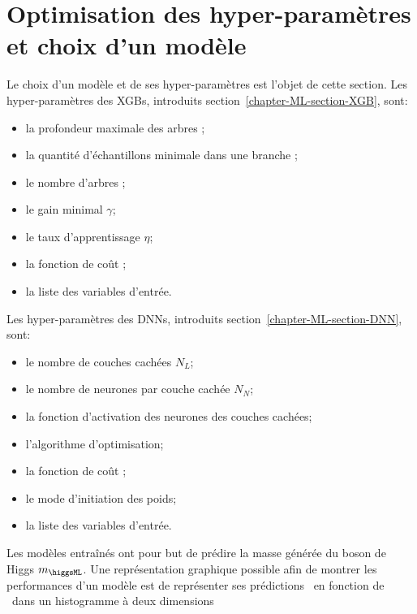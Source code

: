 \section{Optimisation des hyper-paramètres et choix d'un modèle}\label{chapter-ML-section-hyperparameters}
Le choix d'un modèle et de ses hyper-paramètres est l'objet de cette section.
Les hyper-paramètres des XGBs, introduits section~\ref{chapter-ML-section-XGB}, sont:
\begin{itemize}
\item la profondeur maximale des arbres \MaxDepth;
\item la quantité d'échantillons minimale dans une branche \MinChildWeight;
\item le nombre d'arbres \Nestimators;
\item le gain minimal $\gamma$;
\item le taux d'apprentissage $\eta$;
\item la fonction de coût \Loss;
\item la liste des variables d'entrée.
\end{itemize}
Les hyper-paramètres des DNNs, introduits section~\ref{chapter-ML-section-DNN}, sont:
\begin{itemize}
\item le nombre de couches cachées $N_L$;
\item le nombre de neurones par couche cachée $N_N$;
\item la fonction d'activation des neurones des couches cachées;
\item l'algorithme d'optimisation;
\item la fonction de coût \Loss;
\item le mode d'initiation des poids;
\item la liste des variables d'entrée.
\end{itemize}
\par
Les modèles entraînés ont pour but de prédire la masse générée du boson de Higgs $m_{\higgsML}$.
Une représentation graphique possible afin de montrer les performances d'un modèle est de représenter ses prédictions \ypred\ en fonction de \ytrue\ dans un histogramme à deux dimensions

